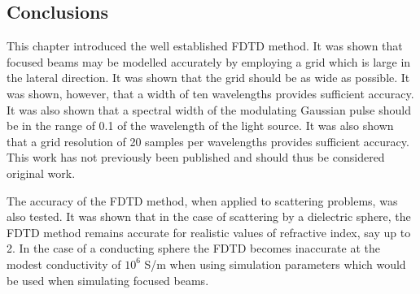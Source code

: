 \documentclass[a4paper, 12pt]{article}
\begin{document}
	\subsection{Conclusions}
	This chapter introduced the well established FDTD method. It was shown
	that focused beams may be modelled accurately by employing a grid
	which is large in the lateral direction. It was shown that the grid
	should be as wide as possible. It was shown, however, that a width of ten
	wavelengths provides sufficient accuracy. It was also shown that a
	spectral width of the modulating Gaussian pulse should be in the range
	of 0.1 of the wavelength of the light source. It was also shown that a
	grid resolution of 20 samples per wavelengths provides sufficient
	accuracy. This work has not previously been published and should thus
	be considered original work.

	The accuracy of the FDTD method, when applied to scattering problems,
	was also tested. It was shown that in the case of scattering by a
	dielectric sphere, the FDTD method remains accurate for realistic
	values of refractive index, say up to 2. In the case of a conducting sphere the
	FDTD becomes inaccurate at the modest conductivity of $10^6$ S/m when
	using simulation parameters which would be used when simulating
	focused beams.
\end{document}

